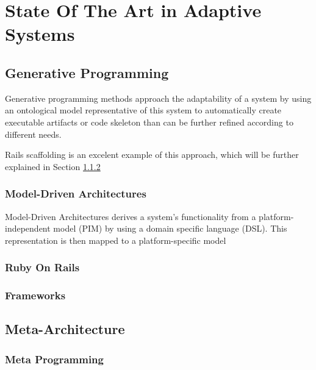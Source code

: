 \chapter{State Of The Art in Adaptive Systems}\label{chap:sota}

\section{Generative Programming}\label{sec:generative_programming}

Generative programming methods approach the adaptability of a system by using an ontological model representative of this system to automatically create executable artifacts or code skeleton than can be further refined according to different needs.

Rails scaffolding is an excelent example of this approach, which will be further explained in Section \ref{sec:ror}

\subsection{Model-Driven Architectures}\label{sec:mda}

Model-Driven Architectures derives a system's functionality from a platform-independent model (PIM) by using a domain specific language (DSL). This representation is then mapped to a platform-specific model

\subsection{Ruby On Rails}\label{sec:ror}

\subsection{Frameworks}\label{sec:frameworks}


\section{Meta-Architecture}\label{sec:meta-architecture}

\subsection{Meta Programming}\label{sec:metaprogramming}


